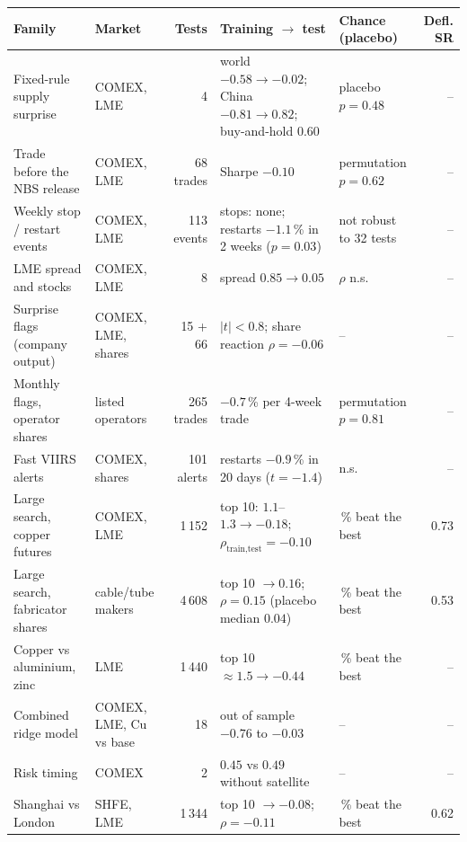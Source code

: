 \documentclass[10pt,a4paper]{article}
\begin{document}
\begin{table}[H]
\centering\footnotesize
\setlength{\tabcolsep}{3.5pt}
\begin{tabularx}{\textwidth}{@{}>{\raggedright\arraybackslash}X >{\raggedright\arraybackslash}p{2.6cm} r >{\raggedright\arraybackslash}p{3.3cm} >{\raggedright\arraybackslash}p{2.6cm} r@{}}
\toprule
\textbf{Family} & \textbf{Market} & \textbf{Tests} & \textbf{Training $\rightarrow$ test} & \textbf{Chance (placebo)} & \textbf{Defl. SR}\\
\midrule
Fixed-rule supply surprise & COMEX, LME & 4 & world $-0.58 \rightarrow -0.02$; China $-0.81 \rightarrow 0.82$; buy-and-hold $0.60$ & placebo $p=0.48$ & --\\
Trade before the NBS release & COMEX, LME & 68 trades & Sharpe $-0.10$ & permutation $p=0.62$ & --\\
Weekly stop / restart events & COMEX, LME & 113 events & stops: none; restarts $-1.1$\,\% in 2 weeks ($p=0.03$) & not robust to 32 tests & --\\
LME spread and stocks & COMEX, LME & 8 & spread $0.85 \rightarrow 0.05$ & $\rho$ n.s. & --\\
Surprise flags (company output) & COMEX, LME, shares & 15 + 66 & $|t|<0.8$; share reaction $\rho=-0.06$ & -- & --\\
Monthly flags, operator shares & 10 listed operators & 265 trades & $-0.7$\,\% per 4-week trade & permutation $p=0.81$ & --\\
Fast VIIRS alerts & COMEX, shares & 101 alerts & restarts $-0.9$\,\% in 20 days ($t=-1.4$) & n.s. & --\\
Large search, copper futures & COMEX, LME & 1\,152 & top 10: $1.1$--$1.3 \rightarrow -0.18$; $\rho_{\text{train,test}}=-0.10$ & 23\,\% beat the best & 0.73\\
Large search, fabricator shares & 7 cable/tube makers & 4\,608 & top 10 $\rightarrow 0.16$; $\rho=0.15$ (placebo median $0.04$) & 17\,\% beat the best & 0.53\\
Copper vs aluminium, zinc & LME & 1\,440 & top 10 $\approx1.5 \rightarrow -0.44$ & 77\,\% beat the best & --\\
Combined ridge model & COMEX, LME, Cu vs base & 18 & out of sample $-0.76$ to $-0.03$ & -- & --\\
Risk timing & COMEX & 2 & $0.45$ vs $0.49$ without satellite & -- & --\\
Shanghai vs London & SHFE, LME & 1\,344 & top 10 $\rightarrow -0.08$; $\rho=-0.11$ & 73\,\% beat the best & 0.62\\

\end{tabularx}
\end{table}
\end{document}
